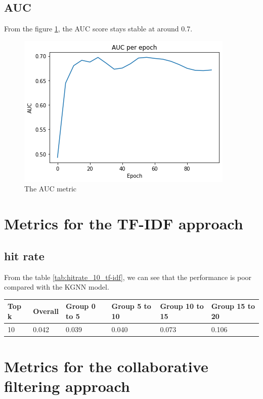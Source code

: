 \documentclass[11pt,twoside]{report}
\begin{document}
\subsection{AUC}
From the figure \ref{fig:auc}, the AUC score stays stable at around 0.7.

\begin{figure}[H]
    \centering
    \includegraphics[scale=0.9]{auc.png}
    \caption{The AUC metric}
    \label{fig:auc}
\end{figure}

\section{Metrics for the TF-IDF approach}
\subsection{hit rate}
From the table \ref{tab:hitrate_10_tf-idf}, we can see that the performance is poor compared with the KGNN model.

\begin{center}
    \begin{tabular}{l | l | l | l | l | l}
    \hline
    Top k & Overall & Group 0 to 5 & Group 5 to 10 & Group 10 to 15 & Group 15 to 20 \\
    \hline
    10 & 0.042 & 0.039 & 0.040 & 0.073 & 0.106 \\
    \end{tabular}
    \label{tab:hitrate_10_tf-idf}
\end{center}

\section{Metrics for the collaborative filtering approach}
\end{document}
